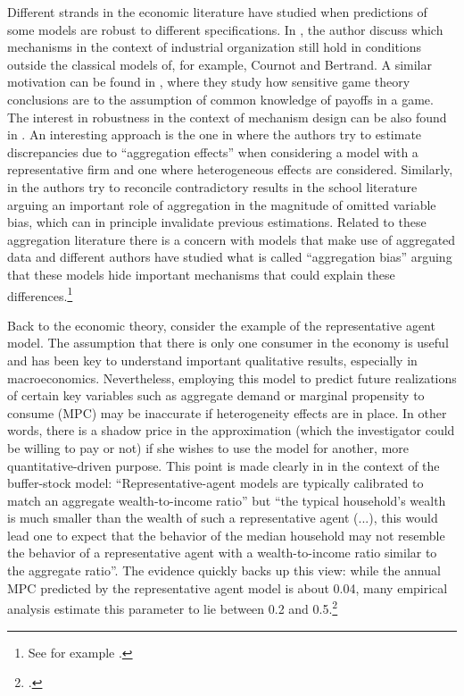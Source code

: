 \documentclass[english, a4paper,12pt]{article}
\begin{document}
Different strands in the economic literature have studied when predictions of some models are robust to different specifications. In \cite{SuttonMarketStruct}, the author discuss which mechanisms in the context of industrial organization still hold in conditions outside the classical models of, for example, Cournot and Bertrand. A similar motivation can be found in \cite{Morris97}, where they study how sensitive game theory conclusions are to the assumption of common knowledge of payoffs in a game. The interest in robustness in the context of mechanism design can be also found in \cite{Morris2011}. An interesting approach is the one in \cite{Basu97} where the authors try to estimate discrepancies due to ``aggregation effects'' when considering a model with a representative firm and one where heterogeneous effects are considered. Similarly, in \cite{SchoolAggregation} the authors try to reconcile contradictory results in the school literature arguing an important role of aggregation in the magnitude of omitted variable bias, which can in principle invalidate previous estimations. Related to these aggregation literature there is a concern with models that make use of aggregated data and different authors have studied what is called ``aggregation bias'' arguing that these models hide important mechanisms that could explain these differences.\footnote{See for example \cite{Agg1, Agg2, Agg3, Agg4}.}  

Back to the economic theory, consider the example of the representative agent model. The assumption that there is only one consumer in the economy is useful and has been key to understand important qualitative results, especially in macroeconomics. Nevertheless, employing this model to predict future realizations of certain key variables such as aggregate demand or marginal propensity to consume (MPC) may be inaccurate if heterogeneity effects are in place. In other words, there is a shadow price in the approximation (which the investigator could be willing to pay or not) if she wishes to use the model for another, more quantitative-driven purpose. This point is made clearly in \cite{CarrollRequiem} in the context of the buffer-stock model: ``Representative-agent models are typically calibrated to match an aggregate wealth-to-income ratio'' but ``the typical household’s wealth is much smaller than the wealth of such a representative agent (...), this would lead one to expect that the behavior of the median household may not resemble the behavior of a representative agent with a wealth-to-income ratio similar to the aggregate ratio''. The evidence quickly backs up this view: while the annual MPC predicted by the representative agent model is about 0.04, many empirical analysis estimate this parameter to lie between 0.2 and 0.5.\footnote{\cite{CarrollRequiem}.} 
\end{document}

